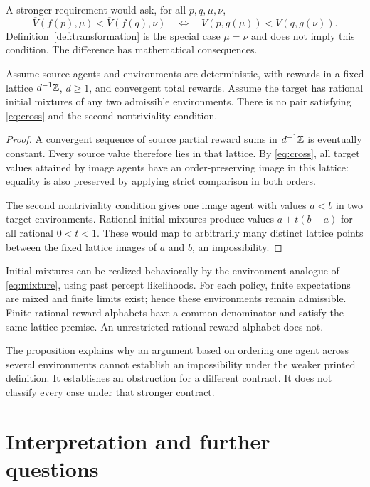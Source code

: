 \documentclass[11pt]{article}
\begin{document}
A stronger requirement would ask, for all $p,q,\mu,\nu$,
\begin{equation}\label{eq:cross}
 \overline V(f(p),\mu)<\overline V(f(q),\nu)
 \quad\Longleftrightarrow\quad
 V(p,g(\mu))<V(q,g(\nu)).
\end{equation}
Definition~\ref{def:transformation} is the special case $\mu=\nu$
and does not imply this condition. The difference has mathematical
consequences.

\begin{proposition}\label{prop:cross}
Assume source agents and environments are deterministic, with rewards
in a fixed lattice $d^{-1}\mathbb Z$, $d\ge1$, and convergent total rewards.
Assume the target has rational initial mixtures of any two admissible
environments. There is no pair satisfying \eqref{eq:cross} and the
second nontriviality condition.
\end{proposition}
\begin{proof}
A convergent sequence of source partial reward sums in $d^{-1}\mathbb Z$
is eventually constant. Every source value therefore lies in that
lattice. By \eqref{eq:cross}, all target values attained by image
agents have an order-preserving image in this lattice: equality is
also preserved by applying strict comparison in both orders.

The second nontriviality condition gives one image agent with values
$a<b$ in two target environments. Rational initial mixtures produce
values $a+t(b-a)$ for all rational $0<t<1$. These would map to
arbitrarily many distinct lattice points between the fixed lattice
images of $a$ and $b$, an impossibility.
\end{proof}

Initial mixtures can be realized behaviorally by the environment
analogue of \eqref{eq:mixture}, using past percept likelihoods.
For each policy, finite expectations are mixed and finite limits
exist; hence these environments remain admissible. Finite rational
reward alphabets have a common denominator and satisfy the same
lattice premise. An unrestricted rational reward alphabet does not.

The proposition explains why an argument based on ordering one
agent across several environments cannot establish an impossibility
under the weaker printed definition. It establishes an obstruction
for a different contract. It does not classify every case under
that stronger contract.

\section{Interpretation and further questions}
\end{document}
